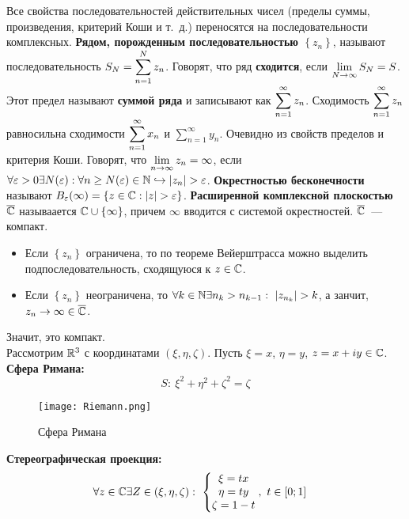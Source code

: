 \corollary
Все свойства последовательностей действительных чисел (пределы суммы,
произведения, критерий Коши и т.~д.) переносятся на последовательности
комплексных.
\Def
\textbf{Рядом, порожденным последовательностью $\left\{ z_n \right\}$}, называют
последовательность $S_N = \displaystyle \sum_{n=1}^Nz_n$. Говорят, что ряд
\textbf{сходится}, если $\displaystyle \lim_{N \to \infty}S_N = S$. Этот предел называют
\textbf{суммой ряда} и записывают как $\displaystyle \sum_{n=1}^\infty z_n$.
\asm
Сходимость $\displaystyle \sum_{n=1}^\infty z_n$ равносильна сходимости $\displaystyle
\sum_{n=1}^\infty x_n$ и $\sum_{n=1}^\infty y_n$.
\pr
Очевидно из свойств пределов и критерия Коши.
\Def
Говорят, что $\displaystyle \lim_{n\to \infty}z_n = \infty$, если $\forall \varepsilon >
0 \exists N(\varepsilon): \forall n \geq N(\varepsilon)\in \NN \hookrightarrow
\left| z_n \right|> \varepsilon$. \textbf{Окрестностью бесконечности} называют
$B_\varepsilon(\infty) = \left\{ z \in \mathbb{C}: \left| z \right| > \varepsilon
\right\}$.
\Def
\textbf{Расширенной комплексной плоскостью} $\overline{\mathbb{C}}$ называается $\mathbb{C} \cup \left\{
    \infty \right\}$, причем $\infty$ вводится с системой окрестностей.
\Note
$\overline{\mathbb{C}}$~--- компакт.
\pr ~
\begin{itemize}
    \item Если $\left\{ z_n \right\}$ ограничена, то по теореме Вейерштрасса
    можно выделить подпоследовательность, сходящуюся к $z \in \mathbb{C}$.
    \item Если $\left\{ z_n \right\}$ неограничена, то $\forall k \in \mathbb{N}
    \exists n_k > n_{k-1}: \ \left| z_{n_k} \right| > k$, а занчит, $z_n \to
    \infty \in \overline{\mathbb{C}}$.
\end{itemize}
Значит, это компакт.
\\
Рассмотрим $\mathbb{R}^3$ с координатами $(\xi, \eta, \zeta)$. Пусть $\xi = x$, $\eta =
y$, $z = x+iy \in \mathbb{C}$.
\Def
\textbf{Сфера Римана:}
\begin{equation}\label{(2.2)}
    S: \ \xi^2+\eta^2+\zeta^2 = \zeta
\end{equation}
\begin{figure}[h!]
		\centering
		\texttt{[image: Riemann.png]}
    \caption{Сфера Римана}
		\label{fig:2.1}
\end{figure}
\Def
\textbf{Стереографическая проекция:}
\begin{align*}
  & \forall z \in \mathbb{C} \exists Z \in (\xi, \eta, \zeta): \ \left\{ \begin{matrix}
          \xi = tx \\
          \eta = ty \\
          \zeta = 1-t
      \end{matrix} \right., \ t \in [0;1]
\end{align*}
